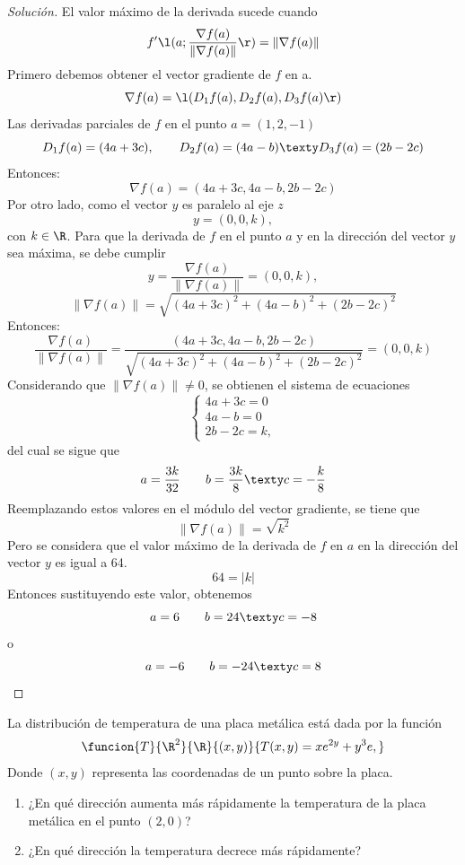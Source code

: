 \documentclass[a4,11pt]{aleph-notas}
\begin{document}
\begin{proof}[Solución]
El valor máximo de la derivada sucede cuando
    \[
        f'\l(a;\frac{\nabla f(a)}{\|\nabla f(a)\|}\r)=\|\nabla f(a)\|
    \]
    Primero debemos obtener el vector gradiente de $f$ en a. 
    \[
        \nabla f(a)=\l(D_1f(a),D_2f(a),D_3f(a)\r)
    \]
    Las derivadas parciales de $f$ en el punto $a=(1,2,-1)$
    \[
        D_1f(a)=(4a+3c),
        \qquad
        D_2f(a)=(4a-b)
        \texty
        D_3f(a)=(2b-2c)
    \]
    Entonces:
    \[
    \nabla f(a)=(4a+3c,4a-b,2b-2c)
           \]
    Por otro lado, como el vector $y$ es paralelo al eje $z$
    \[
        y=(0,0,k),
    \]
    con $k\in\R$. Para que la derivada de $f$ en el punto $a$ y en la dirección del vector $y$ sea máxima, se debe cumplir
    \[
        y=\frac{\nabla f(a)}{\| \nabla f(a) \|}=(0,0,k),
    \]
    \[
        \|\nabla f(a) \|=\sqrt{(4a+3c)^2+(4a-b)^2+(2b-2c)^2}
    \]
    Entonces:
    \[
        \frac{\nabla f(a)}{\| \nabla f(a)\|}=\frac{(4a+3c,4a-b,2b-2c)}{\sqrt{(4a+3c)^2+(4a-b)^2+(2b-2c)^2}}=(0,0,k)
    \]
    Considerando que $\|\nabla f(a) \| \neq0$, se obtienen el sistema de ecuaciones
    \[
        \begin{cases}
            4a+3c=0 \\
            4a-b=0 \\
            2b-2c=k,
        \end{cases}
    \]
    del cual se sigue que
    \[
        a=\frac{3k}{32}
        \qquad
        b=\frac{3k}{8}
        \texty
        c=-\frac{k}{8}
    \]
    Reemplazando estos valores en el módulo del vector gradiente, se tiene que
    \[
        \| \nabla f(a)\| = \sqrt{k^2} 
    \]
    Pero se considera que el valor máximo de la derivada de $f$ en $a$ en la dirección del vector $y$ es igual a 64.
    \[
        64 = |k|
    \]
    Entonces sustituyendo este valor,  obtenemos
    \[
        a=6
        \qquad
        b=24
        \texty
        c=-8
    \]
    o
    \[
        a=-6
        \qquad
        b=-24
        \texty
        c=8
    \]
\end{proof}

\begin{ejer}
La distribución de temperatura de una placa metálica está dada por la función
	\[
        \funcion{T}{\R^2}{\R}
        {(x,y)}{T(x,y) = xe^{2y} + y^3 e,}
	\]
	Donde $(x,y)$ representa las coordenadas de un punto sobre la placa.
    \begin{enumerate}
        \item ¿En qué dirección aumenta más rápidamente la temperatura de la placa metálica en el punto $(2, 0)$?
        \item ¿En qué dirección la temperatura decrece más rápidamente?
    \end{enumerate}
\end{ejer}
\end{document}
